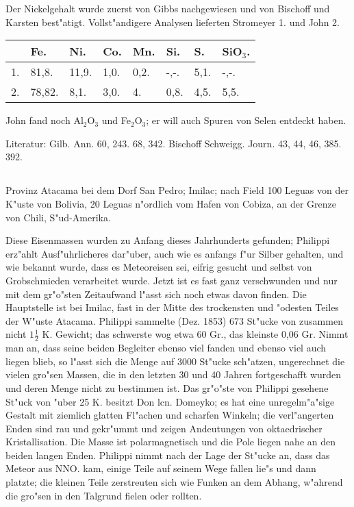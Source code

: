 \documentclass[a4paper, 11pt, oneside]{article}
\begin{document}
Der Nickelgehalt wurde zuerst von Gibbs nachgewiesen und von Bischoff und Karsten best"atigt. Vollst"andigere Analysen lieferten Stromeyer 1. und John 2.
\begin{table}[H]
    \centering\swabfamily\Large
    \begin{tabular}{l l l l l l l l}
         & Fe. & Ni. & Co. & Mn. & Si. & S. & SiO$_{3}$. \\ \hline
        1. & 81,8. & 11,9. & 1,0. & 0,2. & -,-. & 5,1. & -,-. \\
        2. & 78,82. & 8,1. & 3,0. & 4. & 0,8. & 4,5. & 5,5. \\
    \end{tabular}
\end{table}

John fand noch Al$_{2}$O$_{3}$ und Fe$_{2}$O$_{3}$; er will auch Spuren von Selen entdeckt haben.

\normalsize
Literatur: Gilb. Ann. 60, 243. 68, 342. Bischoff Schweigg. Journ. 43, 44, 46, 385. 392.

\subsection{}
\LARGE
\paragraph{}
Provinz Atacama bei dem Dorf San Pedro; Imilac; nach Field 100 Leguas von der K"uste von Bolivia, 20 Leguas n"ordlich vom Hafen von Cobiza, an der Grenze von Chili, S"ud-Amerika.

Diese Eisenmassen wurden zu Anfang dieses Jahrhunderts gefunden; Philippi erz"ahlt Ausf"uhrlicheres dar"uber, auch wie es anfangs f"ur Silber gehalten, und wie bekannt wurde, dass es Meteoreisen sei, eifrig gesucht und selbst von Grobschmieden verarbeitet wurde. Jetzt ist es fast ganz verschwunden und nur mit dem gr"o"sten Zeitaufwand l"asst sich noch etwas davon finden. Die Hauptstelle ist bei Imilac, fast in der Mitte des trockensten und "odesten Teiles der W"uste Atacama. Philippi sammelte (Dez. 1853) 673 St"ucke von zusammen nicht $\mathfrak{1\frac{1}{2}}$ K. Gewicht; das schwerste wog etwa 60 Gr., das kleinste 0,06 Gr. Nimmt man an, dass seine beiden Begleiter ebenso viel fanden und ebenso viel auch liegen blieb, so l"asst sich die Menge auf 3000 St"ucke sch"atzen, ungerechnet die vielen gro"sen Massen, die in den letzten 30 und 40 Jahren fortgeschafft wurden und deren Menge nicht zu bestimmen ist. Das gr"o"ste von Philippi gesehene St"uck von "uber 25 K. besitzt Don lcn. Domeyko; es hat eine unregelm"a"sige Gestalt mit ziemlich glatten Fl"achen und scharfen Winkeln; die verl"angerten Enden sind rau und gekr"ummt und zeigen Andeutungen von oktaedrischer Kristallisation. Die Masse ist polarmagnetisch und die Pole liegen nahe an den beiden langen Enden. Philippi nimmt nach der Lage der St"ucke an, dass das Meteor aus NNO. kam, einige Teile auf seinem Wege fallen lie"s und dann platzte; die kleinen Teile zerstreuten sich wie Funken an dem Abhang, w"ahrend die gro"sen in den Talgrund fielen oder rollten.
\end{document}
